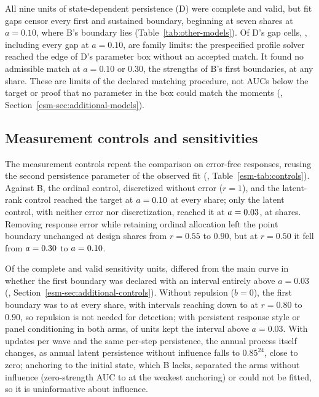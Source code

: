 All nine units of state-dependent persistence (D) were complete and valid, but fit gaps censor every first and sustained boundary, beginning at seven shares at $a=0.10$, where B's boundary lies (Table~\ref{tab:other-models}). Of D's  gap cells, , including every gap at $a=0.10$, are family limits: the prespecified profile solver reached the edge of D's parameter box without an accepted match. It found no admissible match at $a=0.10$ or $0.30$, the strengths of B's first boundaries, at any share. These are limits of the declared matching procedure, not AUCs below the target or proof that no parameter in the box could match the moments (\esmresource, Section~\ref{esm-sec:additional-models}).

\subsection{Measurement controls and sensitivities}\label{sec:results-controls}

The measurement controls repeat the comparison on error-free responses, reusing the second persistence parameter of the observed fit (\esmresource, Table~\ref{esm-tab:controls}). Against B, the ordinal control, discretized without error ($r=1$), and the latent-rank control reached the target at $a=\resultnum{j.controls.ordinal_one.r050.first.point}{0.10}$ at every share; only the latent control, with neither error nor discretization, reached it at $a=\resultnum{j.controls.latent.r055.first.point}{0.03}$, at  shares. Removing response error while retaining ordinal allocation left the point boundary unchanged at design shares from $r=0.55$ to $0.90$, but at $r=0.50$ it fell from $a=\resultnum{j.b.r050.first.point}{0.30}$ to $a=\resultnum{j.controls.ordinal_one.r050.first.point}{0.10}$.

Of the  complete and valid sensitivity units,  differed from the main curve in whether the first boundary was declared with an interval entirely above $a=0.03$ (\esmresource, Section~\ref{esm-sec:additional-controls}). Without repulsion ($b=0$), the first boundary was  to  at every share, with intervals reaching down to  at $r=0.80$ to $0.90$, so repulsion is not needed for detection; with persistent response style or panel conditioning in both arms,  of  units kept the interval above $a=0.03$. With  updates per wave and the same per-step persistence, the annual process itself changes, as annual latent persistence without influence falls to $0.85^{24}$, close to zero; anchoring to the initial state, which B lacks, separated the arms without influence (zero-strength AUC  to  at the weakest anchoring) or could not be fitted, so it is uninformative about influence.

